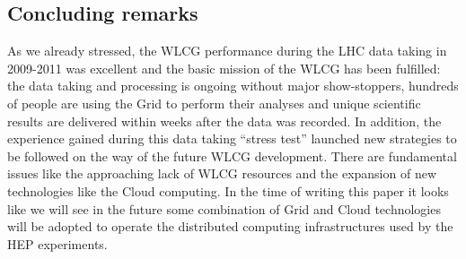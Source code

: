 \documentclass{intech}
\begin{document}
\subsection{Concluding remarks}
%
As we already stressed, the WLCG performance during the LHC data
taking in 2009-2011 was excellent and the basic mission of the WLCG
has been fulfilled: the data taking and processing is ongoing
without major show-stoppers, hundreds of people are using the Grid
to perform their analyses and unique scientific results are
delivered within weeks after the data was recorded. In addition, the
experience gained during this data taking ``stress test'' launched new
strategies to be followed on the way of the future WLCG development.
There are fundamental issues like the approaching lack of WLCG
resources and the expansion of new technologies like the Cloud
computing. In the time of writing this paper it looks like we will
see in the future some combination of Grid and Cloud technologies
will be adopted to operate the distributed computing infrastructures
used by the HEP experiments.




\newpage
\end{document}
